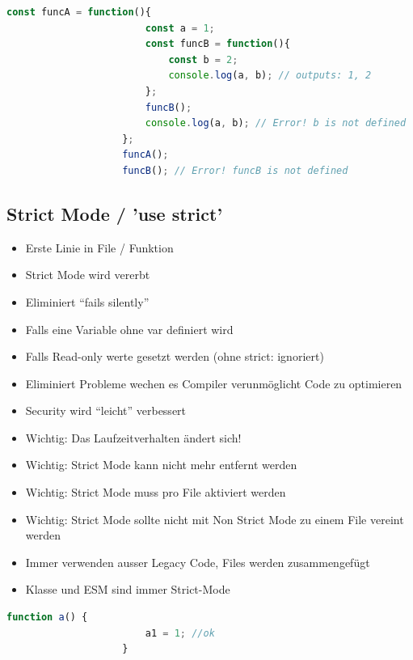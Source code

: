 \documentclass[a4paper, landscape, 8pt]{scrartcl}
\begin{document}
\begin{multicols*}{4}
        \begin{lstlisting}[language=JavaScript]
                    const funcA = function(){
                        const a = 1;
                        const funcB = function(){
                            const b = 2;
                            console.log(a, b); // outputs: 1, 2
                        };
                        funcB();
                        console.log(a, b); // Error! b is not defined
                    };
                    funcA();
                    funcB(); // Error! funcB is not defined
        \end{lstlisting}

        \subsection{Strict Mode / 'use strict'}
        \begin{itemize}
            \item Erste Linie in File / Funktion
            \item Strict Mode wird vererbt
            \item Eliminiert \enquote{fails silently}
            \item Falls eine Variable ohne var definiert wird
            \item Falls Read-only werte gesetzt werden (ohne strict: ignoriert)
            \item Eliminiert Probleme wechen es Compiler verunmöglicht Code zu optimieren
            \item Security wird \enquote{leicht} verbessert
            \item Wichtig: Das Laufzeitverhalten ändert sich!
            \item Wichtig: Strict Mode kann nicht mehr entfernt werden
            \item Wichtig: Strict Mode muss pro File aktiviert werden
            \item Wichtig: Strict Mode sollte nicht mit Non Strict Mode zu einem File vereint werden
            \item Immer verwenden ausser Legacy Code, Files werden zusammengefügt
            \item Klasse und ESM sind immer Strict-Mode
        \end{itemize}

        \begin{lstlisting}[language=JavaScript]
                    function a() {
                        a1 = 1; //ok
                    }


\end{lstlisting}
\end{multicols*}
\end{document}
